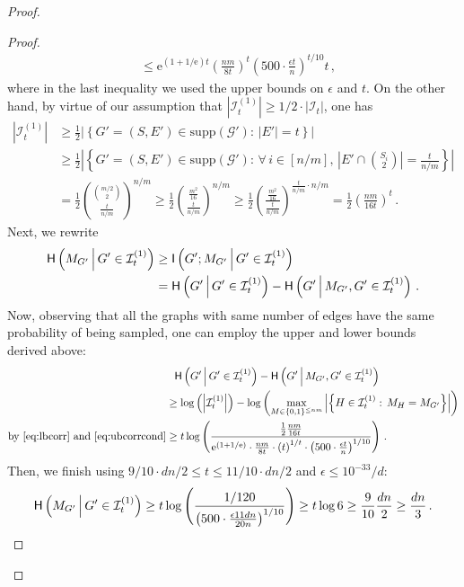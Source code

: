 \documentclass[epsfig,letter,11pt]{article}
\numberwithin{equation}{section}
\newcommand*{\supp}{\mathrm{supp}}
\newcommand{\e}{\mathrm{e}}
\newcommand{\I}{\mathcal{I}}
\newcommand*{\entropy}{\textup{\textsf{H}}}
\newcommand*{\info}{\textup{\textsf{I}}}
\begin{document}
\begin{proof}
\begin{proof}
\begin{align}
		&\le  \e^{(1+1/\e)t} \left(\frac{nm}{8t}\right)^{t}  \left( {500} \cdot \frac{\epsilon t}{n} \right)^{ t/10} t \, , \label{eq:ubcorrcond}
		\end{align}
		where in the last inequality we used the upper bounds on $\epsilon$ and $t$. On the other hand, by virtue of our assumption that $|\mathcal{I}_{t}^{(1)}| \ge {1}/{2} \cdot |\mathcal{I}_t| $, one has
		\begin{align}
			\left|\mathcal{I}^{(1)}_{t}\right| & \ge \frac{1}{2} \left|\left\{G' = (S,E') \in \supp(\mathcal{G}'): \, |E'|  = t \right\}\right|  \\
			&  \ge \frac{1}{2} \left|\left\{G' = (S,E') \in \supp(\mathcal{G}'): \, \forall \, i \in [n/m] ,\, \left|E' \cap \binom{S_i}{2}\right|  = \frac{t}{n/m} \right\}\right| \\
			& = \frac{1}{2}  \binom{\binom{m/2}{2}}{\frac{t}{n/m}}^{n/m} \ge \frac{1}{2}  \binom{\frac{m^2}{16}}{\frac{t}{n/m}}^{n/m} \ge \frac{1}{2}  \left(\frac{\frac{m^2}{16}}{\frac{t}{n/m}}\right)^{\frac{t}{n/m} \cdot n/m} =  \frac{1}{2} \left(\frac{ nm}{16t}\right)^{t}\, . \label{eq:lbcorr}
		\end{align}
		Next, we rewrite
		\begin{align*}
			\entropy\left(M_{G'} \, \middle| \,  G' \in \I_t^{(1)}\right)   & \ge \info\left(G' ; M_{G'} \, \middle| \, G' \in \I_t^{(1)}\right) \\
			&  =  \entropy\left(G' \, \middle| \, G' \in \I_t^{(1)}\right)  -  \entropy\left(G'  \, \middle| \, M_{G'},  G' \in \I_t^{(1)}\right) \, .
		\end{align*}
		Now, observing that all the graphs with same number of edges have the same probability of being sampled, one can employ the upper and lower bounds derived above:
		\begin{align*}
			 & \hphantom{=} \entropy\left(G' \, \middle| \, G' \in \I_t^{(1)}\right)  -  \entropy\left(G'  \, \middle| \,M_{G'},  { G' \in \I_t^{(1)}}\right)\\
			   & \ge  \log\left(	\left|\mathcal{I}^{(1)}_{t}\right|\right) - \log \left(\max_{M \in \{0,1\}^{\le nm}} \left| \left\{H \in \mathcal{I}^{(1)}_{t}: \, M_H = M_{G'} \right\}\right|\right) \\
			\text{by \eqref{eq:lbcorr} and \eqref{eq:ubcorrcond}} & \ge t \log\left(\frac{ \frac{1}{2} \frac{nm}{16t}}{\e^{(1+1/\e)}\cdot \frac{nm}{8t} \cdot  {(t)}^{1/t}\cdot \left( 500\cdot \frac{\epsilon t}{n} \right)^{1/10} }\right) \, .
		\end{align*}
		Then, we finish using $9/10 \cdot dn/2 \le t \le 11/10 \cdot dn/2$ and $\epsilon \le {10^{-33}}/{d}$:
		\begin{align*}
		\entropy\left(M_{G'} \, \middle| \, G' \in \I_t^{(1)}\right)   \ge t \log\left(\frac{ 1/120}{\left( 500 \cdot \frac{\epsilon 11 dn}{20n} \right)^{1/10} }\right)  \ge t \log 6 \ge \frac{9}{10} \frac{dn}{2}\ge \frac{dn}{3}\, .
		\end{align*}
	\end{proof}
	

\end{proof}
\end{document}
